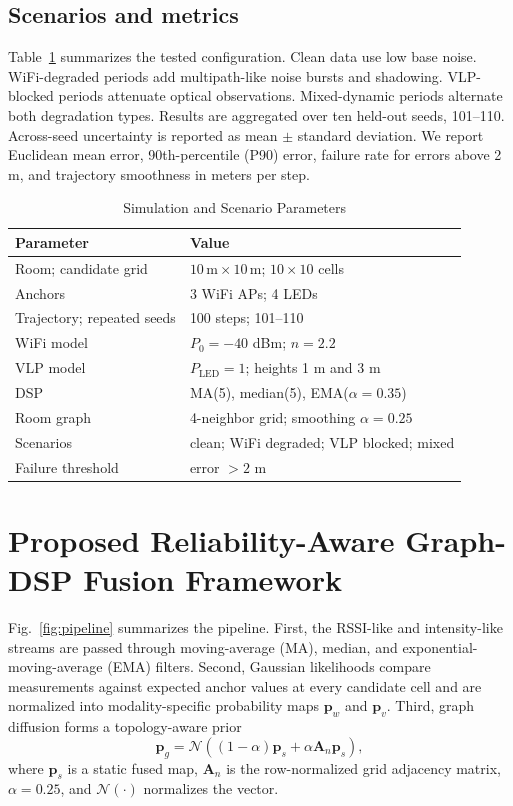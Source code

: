 \documentclass[conference]{IEEEtran}
\begin{document}
\subsection{Scenarios and metrics}
Table~\ref{tab:setup} summarizes the tested configuration. Clean data use low base noise. WiFi-degraded periods add multipath-like noise bursts and shadowing. VLP-blocked periods attenuate optical observations. Mixed-dynamic periods alternate both degradation types. Results are aggregated over ten held-out seeds, 101--110. Across-seed uncertainty is reported as mean $\pm$ standard deviation. We report Euclidean mean error, 90th-percentile (P90) error, failure rate for errors above 2 m, and trajectory smoothness in meters per step.

\begin{table}[t]
\caption{Simulation and Scenario Parameters}
\label{tab:setup}
\centering
\scriptsize
\begin{tabular}{@{}ll@{}}
\toprule
Parameter & Value \\
\midrule
Room; candidate grid & $10\,\mathrm{m}\times10\,\mathrm{m}$; $10\times10$ cells \\
Anchors & 3 WiFi APs; 4 LEDs \\
Trajectory; repeated seeds & 100 steps; 101--110 \\
WiFi model & $P_0=-40$ dBm; $n=2.2$ \\
VLP model & $P_{\mathrm{LED}}=1$; heights 1 m and 3 m \\
DSP & MA(5), median(5), EMA($\alpha=0.35$) \\
Room graph & 4-neighbor grid; smoothing $\alpha=0.25$ \\
Scenarios & clean; WiFi degraded; VLP blocked; mixed \\
Failure threshold & error $>2$ m \\
\bottomrule
\end{tabular}
\end{table}

\section{Proposed Reliability-Aware Graph-DSP Fusion Framework}
Fig.~\ref{fig:pipeline} summarizes the pipeline. First, the RSSI-like and intensity-like streams are passed through moving-average (MA), median, and exponential-moving-average (EMA) filters. Second, Gaussian likelihoods compare measurements against expected anchor values at every candidate cell and are normalized into modality-specific probability maps $\mathbf{p}_{w}$ and $\mathbf{p}_{v}$. Third, graph diffusion forms a topology-aware prior
\begin{equation}
 \mathbf{p}_{g}=\mathcal{N}\!\left((1-\alpha)\mathbf{p}_{s}+\alpha\mathbf{A}_{n}\mathbf{p}_{s}\right),
 \label{eq:gsp}
\end{equation}
where $\mathbf{p}_{s}$ is a static fused map, $\mathbf{A}_{n}$ is the row-normalized grid adjacency matrix, $\alpha=0.25$, and $\mathcal{N}(\cdot)$ normalizes the vector.
\end{document}
